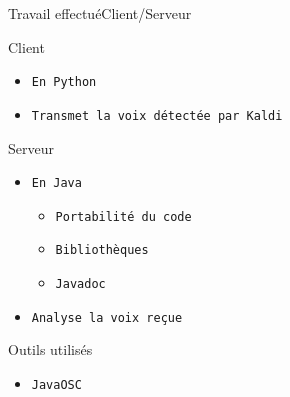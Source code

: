 \documentclass[10pt]{beamer}
\begin{document}
\begin{frame}{Travail effectué}{Client/Serveur}
	\begin{block}{Client}
	  	\begin{itemize}
	  		\item {\tt En Python}
	  		\item {\tt Transmet la voix détectée par Kaldi}		
		\end{itemize}
	\end{block}


	\begin{block}{Serveur}
	  	\begin{itemize}
	  		\item {\tt En Java}
	  		\begin{itemize}
	    			\item {\tt Portabilité du code}
	    			\item {\tt Bibliothèques}
	    			\item {\tt Javadoc}
			\end{itemize}
			\item {\tt Analyse la voix reçue}	    		
		\end{itemize}
	\end{block}
	
	\begin{block}{Outils utilisés}
		\begin{itemize}
	    		\item {\tt JavaOSC}
		\end{itemize}
	\end{block}	
		  			
\end{frame}
\end{document}
